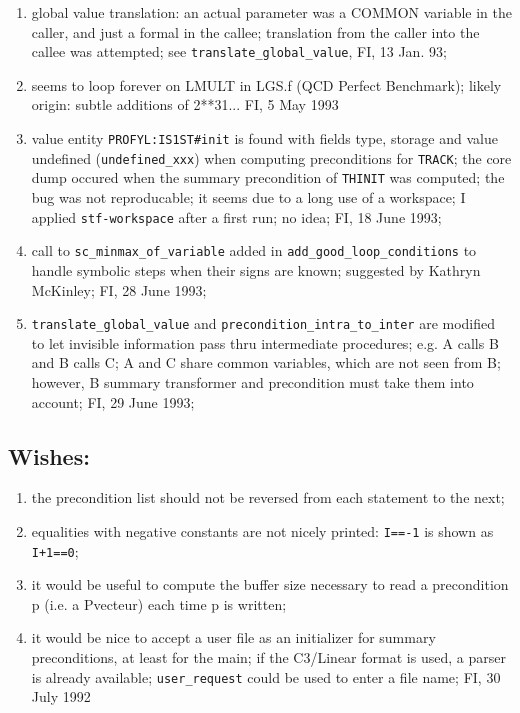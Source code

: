 \begin{enumerate}
  \item global value translation: an actual parameter was a COMMON
	variable in the caller, and just a formal in the callee;
	translation from the caller into the callee was attempted;
	see \verb+translate_global_value+, FI, 13 Jan. 93;

  \item seems to loop forever on LMULT in LGS.f (QCD Perfect Benchmark);
	likely origin: subtle additions of 2**31... FI, 5 May 1993

  \item value entity \verb+PROFYL:IS1ST#init+ is found with fields type,
	storage and value undefined (\verb+undefined_xxx+) when
	computing preconditions for \verb+TRACK+; the core dump occured
	when the summary precondition of \verb+THINIT+ was computed;
	the bug was not reproducable; it seems due to a long use of
	a workspace; I applied \verb+stf-workspace+ after a first run;
	no idea; FI, 18 June 1993;

  \item call to \verb+sc_minmax_of_variable+ added in
	\verb+add_good_loop_conditions+ to handle symbolic steps
	when their signs are known; suggested by Kathryn McKinley;
	FI, 28 June 1993;

  \item \verb+translate_global_value+ and
	\verb+precondition_intra_to_inter+ are modified to let invisible
	information pass thru intermediate procedures; e.g. A calls B
	and B calls C; A and C share common variables, which are not
	seen from B; however, B summary transformer and precondition
	must take them into account; FI, 29 June 1993;

\end{enumerate}

\subsection{Wishes:}

\begin{enumerate}

  \item the precondition list should not be reversed from each statement
	to the next;

  \item equalities with negative constants are not nicely printed:
	\verb+I==-1+ is shown as \verb/I+1==0/;

  \item it would be useful to compute the buffer size necessary to
	read a precondition p (i.e. a Pvecteur) each time p is
	written;

  \item it would be nice to accept a user file as an initializer for
	summary preconditions, at least for the main; if the C3/Linear
	format is used, a parser is already available; \verb+user_request+
	could be used to enter a file name; FI, 30 July 1992

\end{enumerate}

